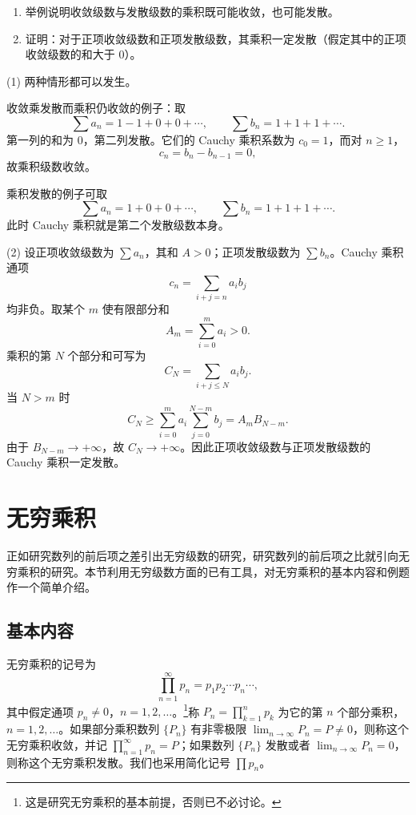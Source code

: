 \begin{xexercise}[16]
\begin{enumerate}[label=(\arabic*)]
\item 举例说明收敛级数与发散级数的乘积既可能收敛，也可能发散。
\item 证明：对于正项收敛级数和正项发散级数，其乘积一定发散（假定其中的正项收敛级数的和大于 0）。
\end{enumerate}
\end{xexercise}
\begin{xsolution}
(1) 两种情形都可以发生。

收敛乘发散而乘积仍收敛的例子：取
\[
 \sum a_n=1-1+0+0+\cdots,
 \qquad
 \sum b_n=1+1+1+\cdots.
\]
第一列的和为 $0$，第二列发散。它们的 Cauchy 乘积系数为 $c_0=1$，而对 $n\geq1$，
\[
 c_n=b_n-b_{n-1}=0,
\]
故乘积级数收敛。

乘积发散的例子可取
\[
 \sum a_n=1+0+0+\cdots,
 \qquad
 \sum b_n=1+1+1+\cdots.
\]
此时 Cauchy 乘积就是第二个发散级数本身。

(2) 设正项收敛级数为 $\sum a_n$，其和 $A>0$；正项发散级数为 $\sum b_n$。Cauchy 乘积通项
\[
 c_n=\sum_{i+j=n}a_ib_j
\]
均非负。取某个 $m$ 使有限部分和
\[
 A_m=\sum_{i=0}^{m}a_i>0.
\]
乘积的第 $N$ 个部分和可写为
\[
 C_N=\sum_{i+j\leq N}a_ib_j.
\]
当 $N>m$ 时
\[
 C_N\geq\sum_{i=0}^{m}a_i\sum_{j=0}^{N-m}b_j
 =A_mB_{N-m}.
\]
由于 $B_{N-m}\to+\infty$，故 $C_N\to+\infty$。因此正项收敛级数与正项发散级数的 Cauchy 乘积一定发散。
\end{xsolution}


\section{无穷乘积}

正如研究数列的前后项之差引出无穷级数的研究，研究数列的前后项之比就引向无穷乘积的研究。本节利用无穷级数方面的已有工具，对无穷乘积的基本内容和例题作一个简单介绍。

\subsection{基本内容}

无穷乘积的记号为
\[
\prod_{n=1}^{\infty}p_n=p_1p_2\cdots p_n\cdots,
\]
其中假定通项 $p_n\neq0$，$n=1,2,\ldots$。\footnote{这是研究无穷乘积的基本前提，否则已不必讨论。}称 $P_n=\prod_{k=1}^{n}p_k$ 为它的第 $n$ 个部分乘积，$n=1,2,\ldots$。如果部分乘积数列 $\{P_n\}$ 有非零极限 $\lim_{n\to\infty}P_n=P\neq0$，则称这个无穷乘积收敛，并记 $\prod_{n=1}^{\infty}p_n=P$；如果数列 $\{P_n\}$ 发散或者 $\lim_{n\to\infty}P_n=0$，则称这个无穷乘积发散。我们也采用简化记号 $\prod p_n$。

